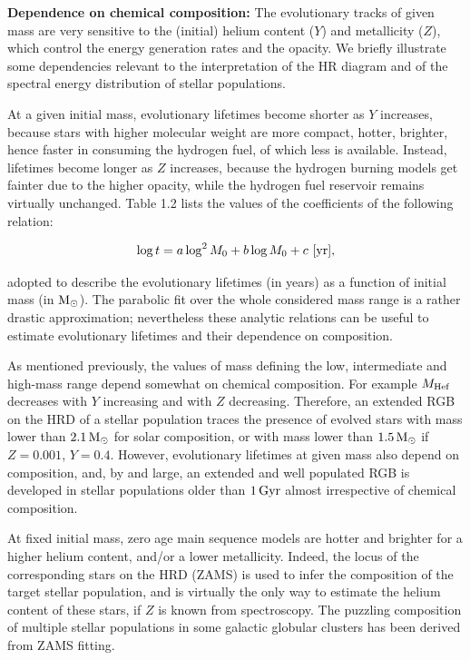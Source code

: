 \documentclass[a4paper,10pt]{article}
\begin{document}
{\noindent}\textbf{Dependence on chemical composition:} The evolutionary tracks of given mass are very sensitive to the (initial) helium content ($Y$) and metallicity ($Z$), which control the energy generation rates and the opacity. We briefly illustrate some dependencies relevant to the interpretation of the HR diagram and of the spectral energy distribution of stellar populations.

{\noindent}At a given initial mass, evolutionary lifetimes become shorter as $Y$ increases, because stars with higher molecular weight are more compact, hotter, brighter, hence faster in consuming the hydrogen fuel, of which less is available. Instead, lifetimes become longer as $Z$ increases, because the hydrogen burning models get fainter due to the higher opacity, while the hydrogen fuel reservoir remains virtually unchanged. Table 1.2 lists the values of the coefficients of the following relation:

\begin{align*}
    \log t = a\log^2M_0 + b\log M_0 + c ~ [{\rm yr}],
\end{align*}

{\noindent}adopted to describe the evolutionary lifetimes (in years) as a function of initial mass (in ${\rm M_\odot}$). The parabolic fit over the whole considered mass range is a rather drastic approximation; nevertheless these analytic relations can be useful to estimate evolutionary lifetimes and their dependence on composition.

{\noindent}As mentioned previously, the values of mass defining the low, intermediate and high-mass range depend somewhat on chemical composition. For example $M_{\rm Hef}$ decreases with $Y$ increasing and with $Z$ decreasing. Therefore, an extended RGB on the HRD of a stellar population traces the presence of evolved stars with mass lower than $2.1\,{\rm M_\odot}$ for solar composition, or with mass lower than $1.5\,{\rm M_\odot}$ if $Z=0.001$, $Y=0.4$. However, evolutionary lifetimes at given mass also depend on composition, and, by and large, an extended and well populated RGB is developed in stellar populations older than $1\,{\rm Gyr}$ almost irrespective of chemical composition.

{\noindent}At fixed initial mass, zero age main sequence models are hotter and brighter for a higher helium content, and/or a lower metallicity. Indeed, the locus of the corresponding stars on the HRD (ZAMS) is used to infer the composition of the target stellar population, and is virtually the only way to estimate the helium content of these stars, if $Z$ is known from spectroscopy. The puzzling composition of multiple stellar populations in some galactic globular clusters has been derived from ZAMS fitting.
\end{document}
